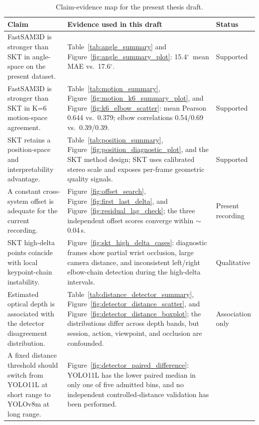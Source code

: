 \documentclass[12pt,a4paper]{article}
\newcommand{\degr}{\ensuremath{^\circ}}
\begin{document}
\begin{table}[H]
  \centering
  \caption{Claim-evidence map for the present thesis draft.}
  \label{tab:claim_evidence}
  \footnotesize
  \renewcommand{\arraystretch}{1.03}
  \begin{tabularx}{\linewidth}{>{\raggedright\arraybackslash}p{3.8cm}>{\raggedright\arraybackslash}X>{\raggedright\arraybackslash}p{2.0cm}}
    \toprule
    Claim & Evidence used in this draft & Status \\
    \midrule
    FastSAM3D is stronger than SKT in angle-space on the present dataset.
    & Table~\ref{tab:angle_summary} and Figure~\ref{fig:angle_summary_plot}: 15.4\degr\ mean MAE vs.\ 17.6\degr.
    & Supported \\
    FastSAM3D is stronger than SKT in K=6 motion-space agreement.
    & Table~\ref{tab:motion_summary}, Figure~\ref{fig:motion_k6_summary_plot}, and Figure~\ref{fig:k6_elbow_scatter}: mean Pearson 0.644 vs.\ 0.379; elbow correlations 0.54/0.69 vs.\ 0.39/0.39.
    & Supported \\
    SKT retains a position-space and interpretability advantage.
    & Table~\ref{tab:position_summary}, Figure~\ref{fig:position_diagnostic_plot}, and the SKT method design; SKT uses calibrated stereo scale and exposes per-frame geometric quality signals.
    & Supported \\
    A constant cross-system offset is adequate for the current recording.
    & Figure~\ref{fig:offset_search}, Figure~\ref{fig:first_last_delta}, and Figure~\ref{fig:residual_lag_check}; the three independent offset scores converge within $\sim$0.04\,s.
    & Present recording \\
    SKT high-delta points coincide with local keypoint-chain instability.
    & Figure~\ref{fig:skt_high_delta_cases}: diagnostic frames show partial wrist occlusion, large camera distance, and inconsistent left/right elbow-chain detection during the high-delta intervals.
    & Qualitative \\
    Estimated optical depth is associated with the detector disagreement distribution.
    & Table~\ref{tab:distance_detector_summary}, Figure~\ref{fig:detector_distance_scatter}, and Figure~\ref{fig:detector_distance_boxplot}; the distributions differ across depth bands, but session, action, viewpoint, and occlusion are confounded.
    & Association only \\
    A fixed distance threshold should switch from YOLO11L at short range to YOLOv8m at long range.
    & Figure~\ref{fig:detector_paired_difference}: YOLO11L has the lower paired median in only one of five admitted bins, and no independent controlled-distance validation has been performed.

\end{tabularx}
\end{table}
\end{document}
